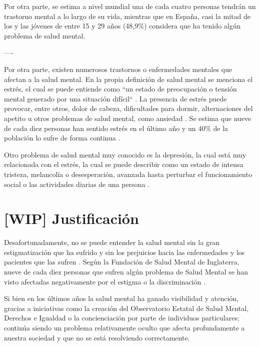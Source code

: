    
    Por otra parte, se estima a nivel mundial una de cada cuatro personas tendrán un trastorno mental a lo largo de su vida, mientras que en España, casi la mitad de los y las jóvenes de entre 15 y 29 años (48,9\%) considera que ha tenido algún problema de salud mental.


    ----

    Por otra parte, existen numerosos trastornos o enfermedades mentales que afectan a la salud mental. En la propia definición de salud mental se menciona el estrés, el cual se puede entiende como ``un estado de preocupación o tensión mental generado por una situación difícil`` \cite{oms_estres_2023}. La presencia de estrés puede provocar, entre otros, dolor de cabeza, dificultades para dormir, alternaciones del apetito u otros problemas de salud mental, como ansiedad \cite{oms_estres_2023}. Se estima que nueve de cada diez personas han sentido estrés en el último año y un 40\% de la población lo sufre de forma continua \cite{nogera_mas_estres_2024}.

    Otro problema de salud mental muy conocido es la depresión, la cual está muy relacionada con el estrés, la cual se puede describir como un estado de intensa tristeza, melancolía o desesperación, avanzada hasta perturbar el funcionamiento social o las actividades diarias de una persona \cite{van_neerven_rarrxr_2008}. 



    

\section{[WIP] Justificación}
    
    Desafortunadamente, no se puede entender la salud mental sin la gran estigmatización que ha sufrido y sin los prejuicios hacia las enfermedades y los pacientes que las sufren \cite{delgado_rompiendo_2021} \cite{andres_tallarda_combatir_2020}. Según la Fundación de Salud Mental de Inglaterra, nueve de cada diez personas que sufren algún problema de Salud Mental se han visto afectadas negativamente por el estigma o la discriminación \cite{mental_health_foundation_stigma_nodate}.

    Si bien en los últimos años la salud mental ha ganado visibilidad y atención, gracias a iniciativas como la creación del Observatorio Estatal de Salud Mental, Derechos e Igualdad \cite{comunicacion_nace_2022} o la concienciación por parte de individuos particulares; continúa siendo un problema relativamente oculto que afecta profundamente a nuestra sociedad y que no se está resolviendo correctamente. 
    
